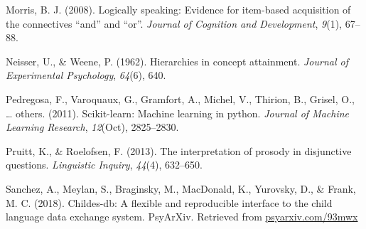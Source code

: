 \documentclass[floatsintext,man]{apa6}
\theoremstyle{definition}
\theoremstyle{definition}
\theoremstyle{definition}
\theoremstyle{remark}
\begin{document}
\hypertarget{ref-morris2008logically}{}
Morris, B. J. (2008). Logically speaking: Evidence for item-based
acquisition of the connectives ``and'' and ``or''. \emph{Journal of
Cognition and Development}, \emph{9}(1), 67--88.

\hypertarget{ref-neisser1962hierarchies}{}
Neisser, U., \& Weene, P. (1962). Hierarchies in concept attainment.
\emph{Journal of Experimental Psychology}, \emph{64}(6), 640.

\hypertarget{ref-pedregosa2011scikit}{}
Pedregosa, F., Varoquaux, G., Gramfort, A., Michel, V., Thirion, B.,
Grisel, O., \ldots{} others. (2011). Scikit-learn: Machine learning in
python. \emph{Journal of Machine Learning Research}, \emph{12}(Oct),
2825--2830.

\hypertarget{ref-pruitt2013interpretation}{}
Pruitt, K., \& Roelofsen, F. (2013). The interpretation of prosody in
disjunctive questions. \emph{Linguistic Inquiry}, \emph{44}(4),
632--650.

\hypertarget{ref-sanchez2018childes}{}
Sanchez, A., Meylan, S., Braginsky, M., MacDonald, K., Yurovsky, D., \&
Frank, M. C. (2018). Childes-db: A flexible and reproducible interface
to the child language data exchange system. PsyArXiv. Retrieved from
\url{psyarxiv.com/93mwx}
\end{document}
